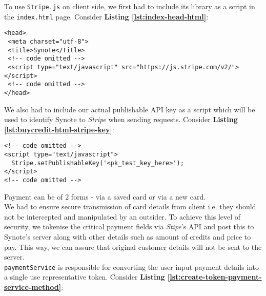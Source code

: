 To use \texttt{Stripe.js} on client side, we first had to include its library as a script in the \texttt{index.html} page. Consider \textbf{Listing \ref{lst:index-head-html}}:\\

\begin{listing}[H]
\begin{verbatim}
<head>
 <meta charset="utf-8">
 <title>Synote</title>
 <!-- code omitted -->
 <script type="text/javascript" src="https://js.stripe.com/v2/"></script>
 <!-- code omitted -->
</head>
\end{verbatim}
\label{lst:index-head-html}
\end{listing}

We also had to include our actual publishable API key as a script which will be used to identify Synote to \textit{Stripe} when sending requests. Consider \textbf{Listing \ref{lst:buycredit-html-stripe-key}}:\\

\begin{listing}[H]
\begin{verbatim}
<!-- code omitted -->
<script type="text/javascript">
  Stripe.setPublishableKey('<pk_test_key_here>');
</script>
<!-- code omitted -->
\end{verbatim}
\label{lst:buycredit-html-stripe-key}
\end{listing}

Payment can be of 2 forms - via a saved card or via a new card.\\

We had to ensure secure transmission of card details from client i.e. they should not be intercepted and manipulated by an outsider. To achieve this level of security, we tokenise the critical payment fields via \textit{Stipe}’s API and post this to Synote’s server along with other details such as amount of credits and price to pay. This way, we can assure that original customer details will not be sent to the server.\\

\texttt{paymentService} is responsible for converting the user input payment details into a single use representative token.  Consider \textbf{Listing \ref{lst:create-token-payment-service-method}}:\\

